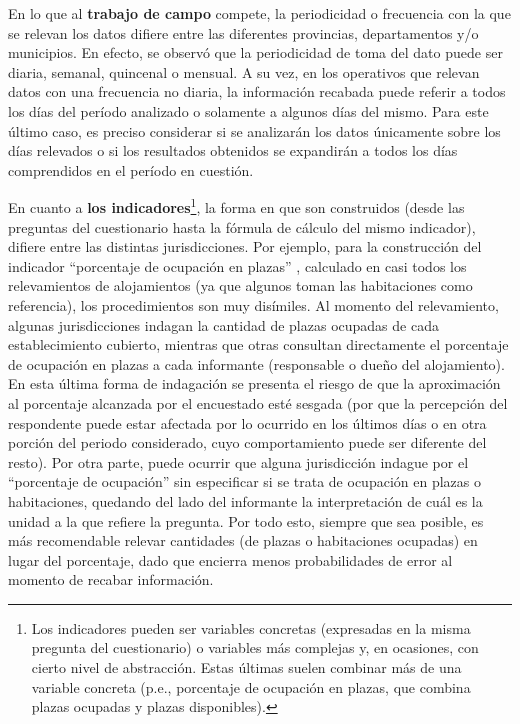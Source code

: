 \documentclass[
]{book}
\begin{document}
En lo que al \textbf{trabajo de campo} compete, la periodicidad o frecuencia con la que se relevan los datos difiere entre las diferentes provincias, departamentos y/o municipios. En efecto, se observó que la periodicidad de toma del dato puede ser diaria, semanal, quincenal o mensual. A su vez, en los operativos que relevan datos con una frecuencia no diaria, la información recabada puede referir a todos los días del período analizado o solamente a algunos días del mismo. Para este último caso, es preciso considerar si se analizarán los datos únicamente sobre los días relevados o si los resultados obtenidos se expandirán a todos los días comprendidos en el período en cuestión.

En cuanto a \textbf{los indicadores}\footnote{Los indicadores pueden ser variables concretas (expresadas en la misma pregunta del cuestionario) o variables más complejas y, en ocasiones, con cierto nivel de abstracción. Estas últimas suelen combinar más de una variable concreta (p.e., porcentaje de ocupación en plazas, que combina plazas ocupadas y plazas disponibles).}, la forma en que son construidos (desde las preguntas del cuestionario hasta la fórmula de cálculo del mismo indicador), difiere entre las distintas jurisdicciones. Por ejemplo, para la construcción del indicador ``porcentaje de ocupación en plazas'' , calculado en casi todos los relevamientos de alojamientos (ya que algunos toman las habitaciones como referencia), los procedimientos son muy disímiles. Al momento del relevamiento, algunas jurisdicciones indagan la cantidad de plazas ocupadas de cada establecimiento cubierto, mientras que otras consultan directamente el porcentaje de ocupación en plazas a cada informante (responsable o dueño del alojamiento). En esta última forma de indagación se presenta el riesgo de que la aproximación al porcentaje alcanzada por el encuestado esté sesgada (por que la percepción del respondente puede estar afectada por lo ocurrido en los últimos días o en otra porción del periodo considerado, cuyo comportamiento puede ser diferente del resto). Por otra parte, puede ocurrir que alguna jurisdicción indague por el ``porcentaje de ocupación'' sin especificar si se trata de ocupación en plazas o habitaciones, quedando del lado del informante la interpretación de cuál es la unidad a la que refiere la pregunta. Por todo esto, siempre que sea posible, es más recomendable relevar cantidades (de plazas o habitaciones ocupadas) en lugar del porcentaje, dado que encierra menos probabilidades de error al momento de recabar información.
\end{document}
